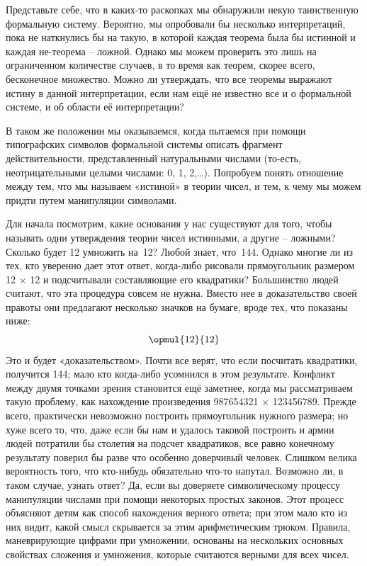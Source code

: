 \documentclass[../main.tex]{subfiles}
\begin{document}
Представьте себе, что в каких-то раскопках мы обнаружили некую таинственную формальную систему. Вероятно, мы опробовали бы несколько интерпретаций, пока не наткнулись бы на такую, в которой каждая теорема была бы истинной и каждая не-теорема \--- ложной. Однако мы можем проверить это лишь на ограниченном количестве случаев, в то время как теорем, скорее всего, бесконечное множество. Можно ли утверждать, что все теоремы выражают истину в данной интерпретации, если нам ещё не известно все и о формальной системе, и об области её интерпретации?

В таком же положении мы оказываемся, когда пытаемся при помощи типографских символов формальной системы описать фрагмент действительности, представленный натуральными числами (то-есть, неотрицательными целыми числами: 0, 1, 2,\ldots). Попробуем понять отношение между тем, что мы называем «истиной» в теории чисел, и тем, к чему мы можем придти путем манипуляции символами.

Для начала посмотрим, какие основания у нас существуют для того, чтобы называть одни утверждения теории чисел истинными, а другие \--- ложными? Сколько будет 12 умножить на~12? Любой знает, что~144. Однако многие ли из тех, кто уверенно дает этот ответ, когда-либо рисовали прямоугольник размером 12 $\times$ 12 и подсчитывали составляющие его квадратики? Большинство людей считают, что эта процедура совсем не нужна. Вместо нее в доказательство своей правоты они предлагают несколько значков на бумаге, вроде тех, что показаны ниже:
\[
    \opmul{12}{12}
\]
Это и будет «доказательством». Почти все верят, что если посчитать квадратики, получится 144; мало кто когда-либо усомнился в этом результате. Конфликт между двумя точками зрения становится ещё заметнее, когда мы рассматриваем такую проблему, как нахождение произведения 987654321 $\times$ 123456789. Прежде всего, практически невозможно построить прямоугольник нужного размера; но хуже всего то, что, даже если бы нам и удалось таковой построить и армии людей потратили бы столетия на подсчет квадратиков, все равно конечному результату поверил бы разве что особенно доверчивый человек. Слишком велика вероятность того, что кто-нибудь обязательно что-то напутал. Возможно ли, в таком случае, узнать ответ? Да, если вы доверяете символическому процессу манипуляции числами при помощи некоторых простых законов. Этот процесс объясняют детям как способ нахождения верного ответа; при этом мало кто из них видит, какой смысл скрывается за этим арифметическим трюком. Правила, маневрирующие цифрами при умножении, основаны на нескольких основных свойствах сложения и умножения, которые считаются верными для всех чисел.
\end{document}
